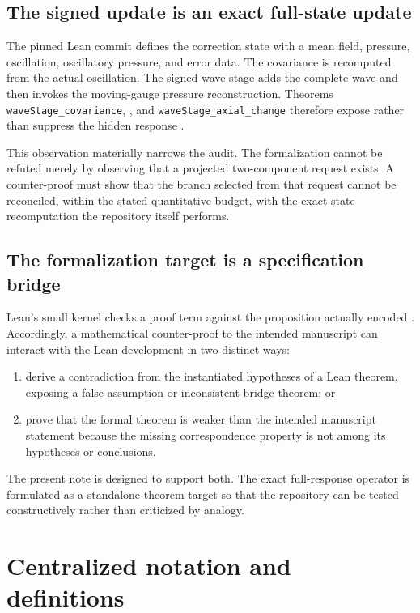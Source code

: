 \documentclass[12pt]{article}
\theoremstyle{plain}
\theoremstyle{definition}
\theoremstyle{remark}
\begin{document}
\subsection{The signed update is an exact full-state update}
The pinned Lean commit defines the correction state with a mean field, pressure, oscillation, oscillatory pressure, and error data. The covariance is recomputed from the actual oscillation. The signed wave stage adds the complete wave and then invokes the moving-gauge pressure reconstruction. Theorems \texttt{waveStage\_covariance}, , and \texttt{waveStage\_axial\_change} therefore expose rather than suppress the hidden response \cite{OpenAILeanRepo2026}.

This observation materially narrows the audit. The formalization cannot be refuted merely by observing that a projected two-component request exists. A counter-proof must show that the branch selected from that request cannot be reconciled, within the stated quantitative budget, with the exact state recomputation the repository itself performs.

\subsection{The formalization target is a specification bridge}
Lean's small kernel checks a proof term against the proposition actually encoded \cite{deMouraEtAl2015,Lean4Reference}. Accordingly, a mathematical counter-proof to the intended manuscript can interact with the Lean development in two distinct ways:
\begin{enumerate}[label=(\roman*),leftmargin=2.1em,itemsep=0.1em]
\item derive a contradiction from the instantiated hypotheses of a Lean theorem, exposing a false assumption or inconsistent bridge theorem; or
\item prove that the formal theorem is weaker than the intended manuscript statement because the missing correspondence property is not among its hypotheses or conclusions.
\end{enumerate}
The present note is designed to support both. The exact full-response operator is formulated as a standalone theorem target so that the repository can be tested constructively rather than criticized by analogy.

\section{Centralized notation and definitions}\label{sec:notation}
\end{document}
